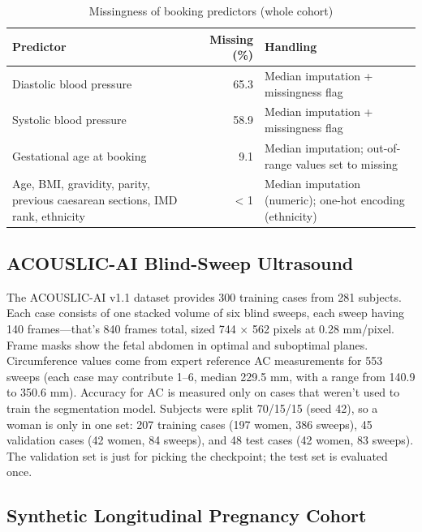\documentclass[conference]{IEEEtran}
\begin{document}
\begin{table}[t]
\centering
\caption{Missingness of booking predictors (whole cohort)}\label{tab:2}
\footnotesize
\setlength{\tabcolsep}{2pt}
\begin{tabular}{p{1.04in}r p{1.92in}}
\toprule
\textbf{Predictor} & \textbf{Missing (\%)} & \textbf{Handling} \\
\midrule
Diastolic blood pressure & 65.3 & Median imputation + missingness flag \\
Systolic blood pressure & 58.9 & Median imputation + missingness flag \\
Gestational age at booking & 9.1 & Median imputation; out-of-range values set to missing \\
Age, BMI, gravidity, parity, previous caesarean sections, IMD rank, ethnicity & < 1 & Median imputation (numeric); one-hot encoding (ethnicity) \\
\bottomrule
\end{tabular}
\end{table}


\subsection{ACOUSLIC-AI Blind-Sweep Ultrasound}

The ACOUSLIC-AI v1.1 dataset \cite{r18,r19} provides 300 training cases from 281 subjects. Each case consists of one stacked volume of six blind sweeps, each sweep having 140 frames---that's 840 frames total, sized 744 \ensuremath{\times} 562 pixels at 0.28 mm/pixel. Frame masks show the fetal abdomen in optimal and suboptimal planes. Circumference values come from expert reference AC measurements for 553 sweeps (each case may contribute 1--6, median 229.5 mm, with a range from 140.9 to 350.6 mm). Accuracy for AC is measured only on cases that weren't used to train the segmentation model. Subjects were split 70/15/15 (seed 42), so a woman is only in one set: 207 training cases (197 women, 386 sweeps), 45 validation cases (42 women, 84 sweeps), and 48 test cases (42 women, 83 sweeps). The validation set is just for picking the checkpoint; the test set is evaluated once.



\subsection{Synthetic Longitudinal Pregnancy Cohort}
\end{document}
